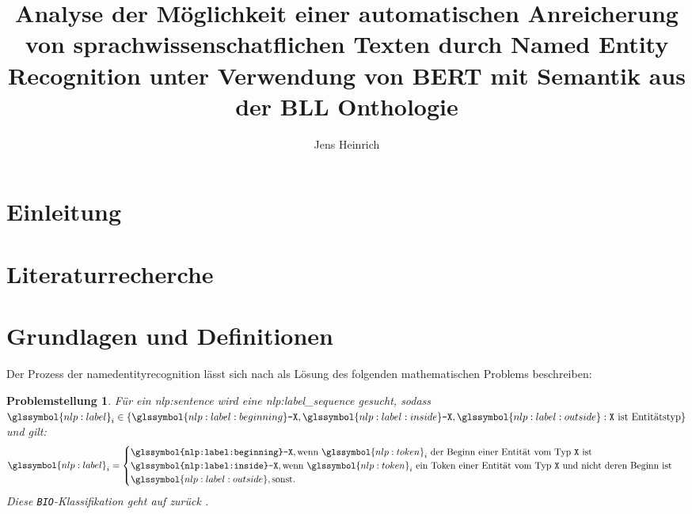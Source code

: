 \documentclass[
german,
]{bachelor}
\author{Jens Heinrich}
\title{%
Analyse der Möglichkeit
einer automatischen Anreicherung von sprachwissenschatflichen Texten
durch Named Entity Recognition
unter Verwendung von BERT
mit Semantik aus der BLL Onthologie%
}
\newtheorem{prob}{Problemstellung}
\begin{document}
\maketitle

\tableofcontents

\section{Einleitung}

\section{Literaturrecherche}

\section{Grundlagen und Definitionen}
Der Prozess der \gls{namedentityrecognition}
lässt sich nach \autocite{2006.15509} als Lösung des folgenden mathematischen Problems beschreiben:

\begin{prob}{}\label{prob:nlp:ner}
Für ein \gls{nlp:sentence} 
wird eine \gls{nlp:label_sequence}  gesucht,
sodass \(
\glssymbol{nlp:label}_i \in
\left\lbrace
	\glssymbol{nlp:label:beginning}\texttt{-X},
	\glssymbol{nlp:label:inside}\texttt{-X},
	\glssymbol{nlp:label:outside}
	:
	\text{\texttt{X} ist Entitätstyp}
\right\rbrace
\)
und gilt:
\[
	\glssymbol{nlp:label}_i =
	\begin{cases}
		\texttt{\glssymbol{nlp:label:beginning}-X},
		\text{wenn \(\glssymbol{nlp:token}_i\)
		der Beginn einer Entität vom Typ \(\texttt{X}\) ist
	}\\
	\texttt{\glssymbol{nlp:label:inside}-X},
		\text{wenn \(\glssymbol{nlp:token}_i\)
		ein Token einer Entität vom Typ \(\texttt{X}\)
		und nicht deren Beginn ist
	}\\
	\glssymbol{nlp:label:outside}, \text{sonst}.
\end{cases}
\]
Diese \texttt{BIO}-Klassifikation geht auf \citeauthor{10.1145/2396761.2398506} zurück \autocite{10.1145/2396761.2398506}.
\end{prob}
\end{document}
